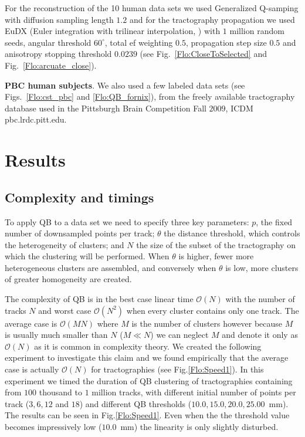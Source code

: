 \documentclass[preprint,authoryear,a4paper,10pt,onecolumn]{elsarticle}
\begin{document}
For the reconstruction of the 10 human data sets we used Generalized
Q-samping \citep{Garyfallidis_thesis} with diffusion sampling length
$1.2$ and for the tractography propagation we used EuDX (Euler
integration with trilinear interpolation, \citet{Garyfallidis_thesis})
with $1$ million random seeds, angular threshold $60^{\circ}$, total
ef weighting $0.5$, propagation step size $0.5$ and anisotropy stopping
threshold $0.0239$ (see Fig.~\ref{Flo:CloseToSelected} 
and Fig.~\ref{Flo:arcuate_close}).

\textbf{PBC human subjects}. We also used a few labeled data sets (see
Figs.~\ref{Flo:cst_pbc} and \ref{Flo:QB_fornix}), from the freely available
tractography database used in the Pittsburgh Brain Competition Fall
$2009$, ICDM pbc.lrdc.pitt.edu.

\section{Results}

\subsection{Complexity and timings\label{sub:Complexity}}

To apply QB to a data set we need to specify three key parameters:
$p$, the fixed number of downsampled points per track; $\theta$
the distance threshold, which controls the heterogeneity of clusters;
and $N$ the size of the subset of the tractography on which the clustering
will be performed. When $\theta$ is higher, fewer more heterogeneous
clusters are assembled, and conversely when $\theta$ is low, more
clusters of greater homogeneity are created.

The complexity of QB is in the best case linear time $\mathcal{O}(N)$ with
the number of tracks $N$ and worst case $\mathcal{O}(N^{2})$ when every cluster
contains only one track. The average case is $\mathcal{O}(MN)$ where $M$ is
the number of clusters however because $M$ is usually much smaller
than $N$ ($M\ll N$) we can neglect $M$ and denote it only as $\mathcal{O}(N)$
as it is common in complexity theory. We created the following experiment
to investigate this claim and we found empirically that the average
case is actually $\mathcal{O}(N)$ for tractographies (see Fig.\ref{Flo:Speed1}).
In this experiment we timed the duration of QB clustering of tractographies
containing from $100$ thousand to $1$ million tracks, with different
initial number of points per track ($3,6,12$ and $18$) and different
QB thresholds ($10.0,15.0,20.0,25.00$~mm). The results can be seen
in Fig.\ref{Flo:Speed1}. Even when the the threshold value becomes impressively
low ($10.0$~mm) the linearity is only slightly disturbed.
\end{document}
